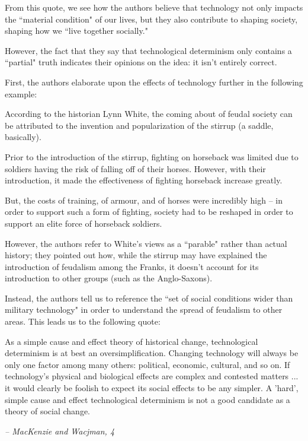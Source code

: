 \documentclass[openany]{book}
\begin{document}
From this quote, we see how the authors believe that technology not only impacts the ``material condition" of our lives, but they also contribute to shaping society, shaping how we ``live together socially."

However, the fact that they say that technological determinism only contains a ``partial" truth indicates their opinions on the idea: it isn't entirely correct.

First, the authors elaborate upon the effects of technology further in the following example:
\begin{example}
	According to the historian Lynn White, the coming about of feudal society can be attributed to the invention and popularization of the stirrup (a saddle, basically).
	
	Prior to the introduction of the stirrup, fighting on horseback was limited due to soldiers having the risk of falling off of their horses. However, with their introduction, it made the effectiveness of fighting horseback increase greatly.
	
	But, the costs of training, of armour, and of horses were incredibly high -- in order to support such a form of fighting, society had to be reshaped in order to support an elite force of horseback soldiers.
\end{example}

However, the authors refer to White's views as a ``parable" rather than actual history; they pointed out how, while the stirrup may have explained the introduction of feudalism among the Franks, it doesn't account for its introduction to other groups (such as the Anglo-Saxons).

Instead, the authors tell us to reference the ``set of social conditions wider than military technology" in order to understand the spread of feudalism to other areas. This leads us to the following quote:

\begin{fancyquotes}
	As a simple cause and effect theory of historical change, technological determinism is at best an oversimplification. Changing technology will always be only one factor among many others: political, economic, cultural, and so on. If technology's physical and biological effects are complex and contested matters ... it would clearly be foolish to expect its social effects to be any simpler. A 'hard', simple cause and effect technological determinism is not a good candidate as a theory of social change.
	
	\begin{flushright}
		\emph{-- MacKenzie and Wacjman, 4}
	\end{flushright}
\end{fancyquotes}
\end{document}
